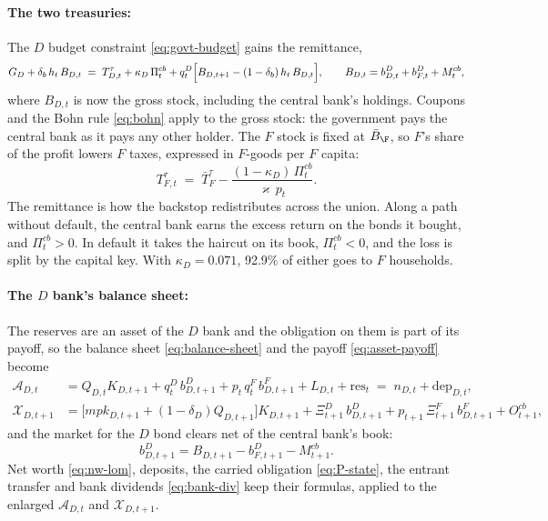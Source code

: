 \paragraph{The two treasuries:}
The $D$ budget constraint \eqref{eq:govt-budget} gains the remittance,
\begin{equation}
G_D+\delta_b\,h_t\,B_{D,t}
\;=\;T^{\tau}_{D,t}+\kappa_D\,\Pi^{cb}_t
+q^{D}_t\Bigl[B_{D,t+1}-(1-\delta_b)\,h_t\,B_{D,t}\Bigr],
\qquad
B_{D,t}=b^{D}_{D,t}+b^{D}_{F,t}+M^{cb}_t,
\label{eq:govt-budget-cb}
\end{equation}
where $B_{D,t}$ is now the gross stock, including the central bank's holdings.
Coupons and the Bohn rule \eqref{eq:bohn} apply to the gross stock: the
government pays the central bank as it pays any other holder. The $F$ stock is
fixed at $\bar B_\F$, so $F$'s share of the profit lowers $F$ taxes, expressed in
$F$-goods per $F$ capita:
\begin{equation}
T^{\tau}_{F,t}\;=\;\bar T^{\tau}_{F}-\frac{(1-\kappa_D)\,\Pi^{cb}_t}{\varkappa\,p_t}.
\label{eq:tax-F-cb}
\end{equation}
The remittance is how the backstop redistributes across the union. Along a path
without default, the central bank earns the excess return on the bonds it bought,
and $\Pi^{cb}_t>0$. In default it takes the haircut on its book, $\Pi^{cb}_t<0$,
and the loss is split by the capital key. With $\kappa_D=0.071$, 92.9\% of either
goes to $F$ households.

\paragraph{The $D$ bank's balance sheet:}
The reserves are an asset of the $D$ bank and the obligation on them is part of
its payoff, so the balance sheet \eqref{eq:balance-sheet} and the payoff
\eqref{eq:asset-payoff} become
\begin{align}
\mathcal{A}_{D,t}
&=Q_{D,t}K_{D,t+1}+q^{D}_t\,b^{D}_{D,t+1}+p_t\,q^{F}_t\,b^{F}_{D,t+1}+L_{D,t}
 +\mathrm{res}_t
 \;=\;n_{D,t}+\mathrm{dep}_{D,t},
\label{eq:balance-sheet-cb}\\[3pt]
\mathcal{X}_{D,t+1}
&=\bigl[mpk_{D,t+1}+(1-\delta_D)Q_{D,t+1}\bigr]K_{D,t+1}
 +\Xi^{D}_{t+1}\,b^{D}_{D,t+1}+p_{t+1}\,\Xi^{F}_{t+1}\,b^{F}_{D,t+1}
 +O^{cb}_{t+1},
\label{eq:asset-payoff-cb}
\end{align}
and the market for the $D$ bond clears net of the central bank's book:
\begin{equation}
b^{D}_{D,t+1}=B_{D,t+1}-b^{D}_{F,t+1}-M^{cb}_{t+1}.
\label{eq:bond-clearing-cb}
\end{equation}
Net worth \eqref{eq:nw-lom}, deposits, the carried obligation \eqref{eq:P-state},
the entrant transfer and bank dividends \eqref{eq:bank-div} keep their formulas,
applied to the enlarged $\mathcal{A}_{D,t}$ and $\mathcal{X}_{D,t+1}$.

